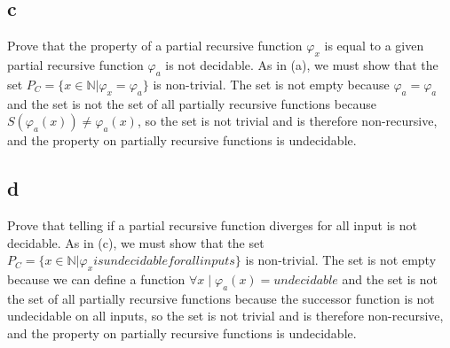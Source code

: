 \documentclass[12pt]{article}
\begin{document}
\subsection*{c} 
Prove that the property of a partial recursive function $\varphi_x$ is equal to a given partial recursive function $\varphi_a$ is not decidable.  As in (a), we must show that the set $P_C = \{x \in \mathbb{N} | \varphi_x = \varphi_a \}$ is non-trivial.  The set is not empty because $\varphi_a = \varphi_a$ and the set is not the set of all partially recursive functions because $S (\varphi_a(x)) \neq \varphi_a(x)$, so the set is not trivial and is therefore non-recursive, and the property on partially recursive functions is undecidable.  
\subsection*{d}
Prove that telling if a partial recursive function diverges for all input is not decidable.  As in (c), we must show that the set $P_C = \{x \in \mathbb{N} | \varphi_x is undecidable for all inputs\}$ is non-trivial.  The set is not empty because we can define a function $\forall x \mid \varphi_a(x) = undecidable$ and the set is not the set of all partially recursive functions because the successor function is not undecidable on all inputs, so the set is not trivial and is therefore non-recursive, and the property on partially recursive functions is undecidable.  
\end{document}
